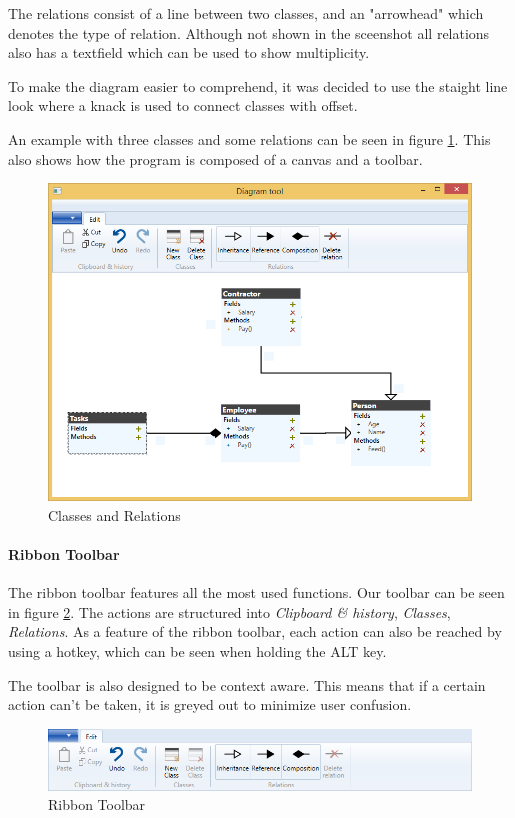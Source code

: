 The relations consist of a line between two classes, and an "arrowhead" which
denotes the type of relation. Although not shown in the sceenshot all relations
also has a textfield which can be used to show multiplicity.

To make the diagram easier to comprehend, it was decided to use the staight line
look where a knack is used to connect classes with offset.

An example with three classes and some relations can be seen in figure
\ref{classes}. This also shows how the program is composed of a canvas and a
toolbar.

\begin{figure}[H]
\centering
\includegraphics[width=\linewidth]{"img/example"}
\caption{Classes and Relations \label{classes}}
\end{figure}


\paragraph{Ribbon Toolbar}
The ribbon toolbar features all the most used functions. Our toolbar can be seen in
figure \ref{toolbar}. The actions are
structured into \textit{Clipboard \& history}, \textit{Classes},
\textit{Relations}. As a feature of the ribbon toolbar, each action can also be
reached by using a hotkey, which can be seen when holding the ALT key.

The toolbar is also designed to be context aware. This means that if a certain action
can't be taken, it is greyed out to minimize user confusion.
\begin{figure}[H]
\centering
\includegraphics[width=\linewidth]{"img/edit menu"}
\caption{Ribbon Toolbar \label{toolbar}}
\end{figure}

